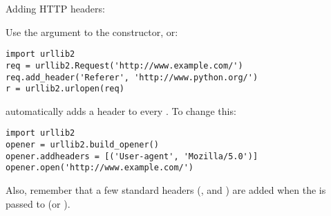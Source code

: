 Adding HTTP headers:

Use the  argument to the  constructor, or:

\begin{verbatim}
import urllib2
req = urllib2.Request('http://www.example.com/')
req.add_header('Referer', 'http://www.python.org/')
r = urllib2.urlopen(req)
\end{verbatim}

 automatically adds a 
header to every .  To change this:

\begin{verbatim}
import urllib2
opener = urllib2.build_opener()
opener.addheaders = [('User-agent', 'Mozilla/5.0')]
opener.open('http://www.example.com/')
\end{verbatim}

Also, remember that a few standard headers
(,  and
) are added when the  is passed to
 (or ).
